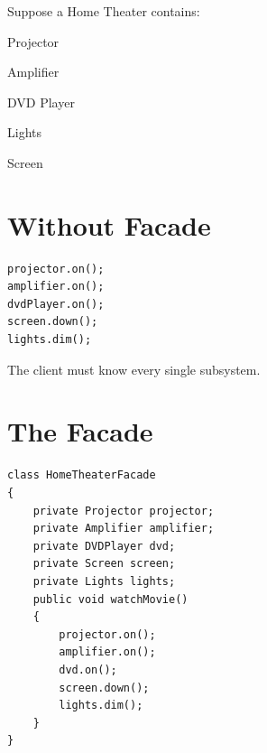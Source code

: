 \documentclass[11pt,a4paper]{book}
\begin{document}
Suppose a Home Theater contains:


Projector


Amplifier


DVD Player


Lights


Screen


\section{Without Facade}

\begin{verbatim}
projector.on();
amplifier.on();
dvdPlayer.on();
screen.down();
lights.dim();
\end{verbatim}


The client must know every
single subsystem.


\section{The Facade}

\begin{verbatim}
class HomeTheaterFacade
{
    private Projector projector;
    private Amplifier amplifier;
    private DVDPlayer dvd;
    private Screen screen;
    private Lights lights;
    public void watchMovie()
    {
        projector.on();
        amplifier.on();
        dvd.on();
        screen.down();
        lights.dim();
    }
}
\end{verbatim}
\end{document}
